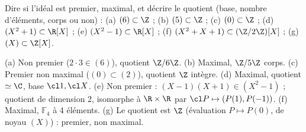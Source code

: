 \begin{exo}
Dire si l'idéal est premier, maximal, et décrire le quotient (base, nombre d'éléments, corps ou non) : (a) $(6)\subset\Z$ ; (b) $(5)\subset\Z$ ; (c) $(0)\subset\Z$ ; (d) $(X^2+1)\subset\R[X]$ ; (e) $(X^2-1)\subset\R[X]$ ; (f) $(X^2+X+1)\subset(\Z/2\Z)[X]$ ; (g) $(X)\subset\Z[X]$.
\begin{corrige}
(a) Non premier ($2\cdot3\in(6)$), quotient $\Z/6\Z$. (b) Maximal, $\Z/5\Z$ corps. (c) Premier non maximal ($(0)\subset(2)$), quotient $\Z$ intègre. (d) Maximal, quotient $\simeq\C$, base $\cl1,\cl X$. (e) Non premier : $(X-1)(X+1)\in(X^2-1)$ ; quotient de dimension 2, isomorphe à $\R\times\R$ par $\cl P\mapsto(P(1),P(-1))$. (f) Maximal, $\mathbb F_4$ à 4 éléments. (g) Le quotient est $\Z$ (évaluation $P\mapsto P(0)$, de noyau $(X)$) : premier, non maximal.
\end{corrige}
\end{exo}

